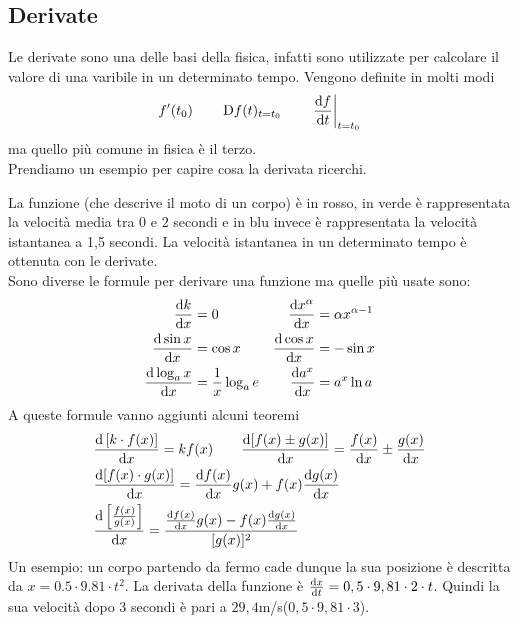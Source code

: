 \subsection{Derivate}
Le derivate sono una delle basi della fisica, infatti sono utilizzate per calcolare il valore di 
una varibile in un determinato tempo. Vengono definite in molti modi 
\begin{equation*}
  f'(t_0) \qquad \mathop{}\!\mathrm{D} f(t)_{t=t_0}\qquad \left.\frac{\mathop{}\!\mathrm{d} f}{\mathop{}\!\mathrm{d} t}\right|_{t=t_0}
  \end{equation*}
  ma quello più comune in fisica è il terzo.\\
  Prendiamo un esempio per capire cosa la derivata ricerchi.
  \begin{center}
  \end{center}
  La funzione (che descrive il moto di un corpo) è in rosso, in verde è rappresentata la velocità 
  media tra $0$ e $2$ secondi e in blu invece è rappresentata la velocità istantanea a 1,5 secondi. 
  La velocità istantanea in un determinato tempo è ottenuta con le derivate.\\
  Sono diverse le formule per derivare una funzione ma quelle più usate sono:
  \begin{align*}
    \frac{\dif k}{\dif x}&=0 &\quad \frac{\dif x^\alpha}{\dif x}&=\alpha x^{\alpha-1}\\
    \frac{\dif\sin x}{\dif x}&=\cos x & \frac{\dif\cos x}{\dif x}&=-\sin x\\
    \frac{\dif\log_ax}{\dif x}&=\frac{1}{x}\log_ae & \frac{\dif a^{x}}{\dif x}&=a^{x}\ln a
  \end{align*}
  A queste formule vanno aggiunti alcuni teoremi
  \begin{align*}
    &\frac{\dif\left[k\cdot f(x) \right]}{\dif x}=kf(x)\qquad
    \frac{\dif[f(x)\pm g(x)]}{\dif x}=\frac{f(x)}{\dif x}\pm \frac{g(x)}{\dif x}\\
    &\frac{\dif [f(x)\cdot g(x)]}{\dif x}=\frac{\dif f(x)}{\dif x}g(x) + 
    f(x)\frac{\dif g(x)}{\dif x}\\
    &\frac{\dif \left[\frac{f(x)}{g(x)}\right]}{\dif x} =
    \frac{\frac{\dif f(x)}{\dif x}g(x)-f(x)\frac{\dif g(x)}{\dif x}}{[g(x)]^2}
  \end{align*}
  Un esempio: un corpo partendo da fermo cade dunque la sua posizione è descritta da 
  $x=0.5\cdot9.81\cdot t^{2}$. La derivata della funzione è 
  $\frac{\mathop{}\!\mathrm{d} x}{\mathop{}\!\mathrm{d} t}=0,5\cdot9,81\cdot2\cdot t$. 
  Quindi la sua velocità dopo 3 secondi è pari a $29,4$m/s($0,5\cdot9,81\cdot3$).

